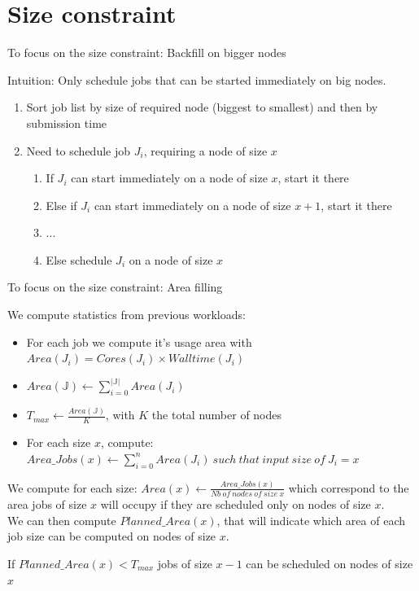 \documentclass{libs/ufc_format}
\newcommand{\core}{\mathit{Cores}\xspace}
\newcommand{\walltime}{\mathit{Walltime}\xspace}
\newcommand{\jobset}{\ensuremath{\mathbb{J}}\xspace}
\begin{document}
{\section{Size constraint}
\begin{frame}{To focus on the size constraint: Backfill on bigger nodes}
\begin{block}{Intuition: Only schedule jobs that can be started immediately on big nodes.}
	\begin{enumerate}
		\item Sort job list by size of required node (biggest to smallest) and then by submission time
		\item Need to schedule job $J_i$, requiring a node of size $x$
		\begin{enumerate}
			\item If $J_i$ can start immediately on a node of size $x$, start it there
			\item Else if $J_i$ can start immediately on a node of size $x+1$, start it there
			\item ...
			\item Else schedule $J_i$ on a node of size $x$
		\end{enumerate}
	\end{enumerate}
\end{block}
\end{frame}

\begin{frame}{To focus on the size constraint: Area filling}
	\begin{block}{}

We compute statistics from previous workloads:
\begin{itemize}
	\item For each job we compute it's usage area with $Area(J_i) = \core(J_i) \times \walltime(J_i)$
	\item $Area(\jobset) \gets \sum_{i=0}^{|\jobset|} Area(J_i)$
	\item $T_{max} \gets \frac{Area(\jobset)}{K}$, with $K$ the total number of nodes
	\item For each size $x$, compute: $Area\_Jobs(x) \gets \sum_{i=0}^{n} Area(J_i)~such~that~input~size~of~J_i = x$
\end{itemize}

We compute for each size: $Area(x) \gets \frac{Area\_Jobs(x)}{Nb~of~nodes~of~size~x}$ which correspond
to the area jobs of size $x$ will occupy if they are scheduled only on nodes of size $x$.\\
We can then compute $Planned\_Area(x)$, that will indicate which area
of each job size can be computed on nodes of size $x$.
	\end{block}
	If $Planned\_Area(x) < T_{max}$ \MVRightarrow{} jobs of size $x-1$ can be scheduled on nodes of size $x$
\end{frame}

}
\end{document}
